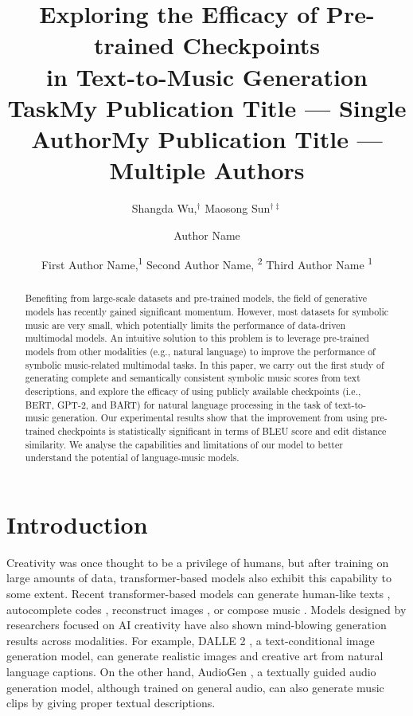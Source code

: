 \documentclass[letterpaper]{article} %
\title{Exploring the Efficacy of Pre-trained Checkpoints \\ in Text-to-Music Generation Task}
\author {
    Shangda Wu,$^{\dagger}$
    Maosong Sun$^{\dagger\ddagger}$
}
\title{My Publication Title --- Single Author}
\author {
    Author Name
}
\title{My Publication Title --- Multiple Authors}
\author {
    First Author Name,\textsuperscript{\rm 1}
    Second Author Name, \textsuperscript{\rm 2}
    Third Author Name \textsuperscript{\rm 1}
}
\begin{document}
\maketitle

\begin{abstract}
Benefiting from large-scale datasets and pre-trained models, the field of generative models has recently gained significant momentum. However, most datasets for symbolic music are very small, which potentially limits the performance of data-driven multimodal models. An intuitive solution to this problem is to leverage pre-trained models from other modalities (e.g., natural language) to improve the performance of symbolic music-related multimodal tasks. In this paper, we carry out the first study of generating complete and semantically consistent symbolic music scores from text descriptions, and explore the efficacy of using publicly available checkpoints (i.e., BERT, GPT-2, and BART) for natural language processing in the task of text-to-music generation. Our experimental results show that the improvement from using pre-trained checkpoints is statistically significant in terms of BLEU score and edit distance similarity. We analyse the capabilities and limitations of our model to better understand the potential of language-music models.
\end{abstract}

\section{Introduction}
Creativity was once thought to be a privilege of humans, but after training on large amounts of data, transformer-based models \cite{DBLP:conf/nips/VaswaniSPUJGKP17} also exhibit this capability to some extent. Recent transformer-based models can generate human-like texts \cite{DBLP:conf/nips/BrownMRSKDNSSAA20}, autocomplete codes \cite{DBLP:journals/corr/abs-2107-03374}, reconstruct images \cite{DBLP:conf/cvpr/HeCXLDG22}, or compose music \cite{DBLP:journals/corr/abs-2005-00341}. Models designed by researchers focused on AI creativity have also shown mind-blowing generation results across modalities. For example, DALLE 2 \cite{DBLP:journals/corr/abs-2204-06125}, a text-conditional image generation model, can generate realistic images and creative art from natural language captions. On the other hand, AudioGen \cite{DBLP:journals/corr/abs-2209-15352}, a textually guided audio generation model, although trained on general audio, can also generate music clips by giving proper textual descriptions.
\end{document}
